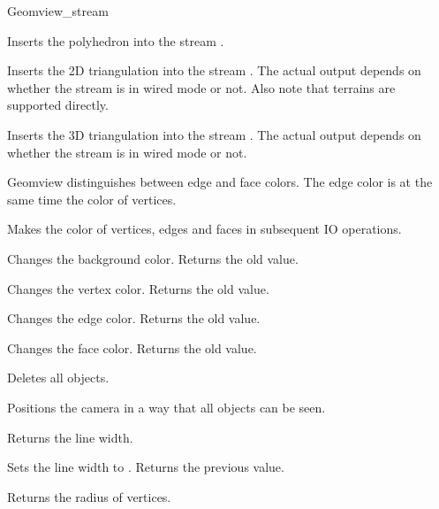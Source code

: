 \begin{ccClass}{Geomview_stream}

{Inserts the polyhedron  into the stream \ccVar.}

{Inserts the 2D triangulation  into the stream \ccVar.
 The actual output depends on whether the stream is in wired mode or not.
 Also note that terrains are supported directly.}

{Inserts the 3D triangulation  into the stream \ccVar.
 The actual output depends on whether the stream is in wired mode or not.}


Geomview distinguishes between edge and face colors. The edge color
is at the same time the color of vertices. 

{Makes  the color of vertices, edges and faces in subsequent IO 
 operations.}

{Changes the background color. Returns the old value.}

{Changes the vertex color. Returns the old value.}

{Changes the edge color. Returns the old value.}


{Changes the face color. Returns the old value.}



{Deletes all objects.}

{Positions the camera in a way that all objects can be seen.}

{Returns the line width.}

{Sets the line width to . Returns the previous value.}

{Returns the radius of vertices.}


\end{ccClass}
